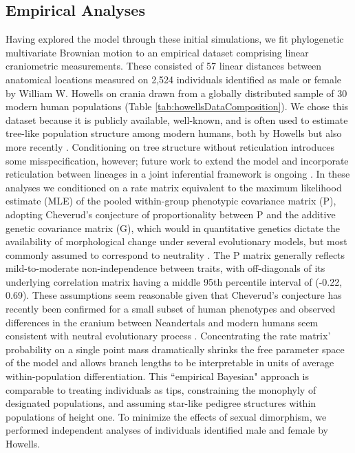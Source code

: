 \documentclass[10pt, twocolumn, twoside]{article}
\begin{document}
\subsection{Empirical Analyses}

Having explored the model through these initial simulations, we fit phylogenetic multivariate Brownian motion to an empirical dataset comprising linear craniometric measurements. These consisted of 57 linear distances between anatomical locations measured on 2,524 individuals identified as male or female by William W. Howells \citeyear{howellsCranialVariationMan1973, howellsSkullShapesMap1989, howellsWhoWhoSkulls1995} on crania drawn from a globally distributed sample of 30 modern human populations (Table \ref{tab:howellsDataComposition}). We chose this dataset because it is publicly available, well-known, and is often used to estimate tree-like population structure among modern humans, both by Howells but also more recently \citep[e.g.][]{rosemanRandomGeneticDrift2016}. Conditioning on tree structure without reticulation introduces some misspecification, however; future work to extend the model and incorporate reticulation between lineages in a joint inferential framework is ongoing \citep[following e.g.][]{pickrellInferencePopulationSplits2012}. In these analyses we conditioned on a rate matrix equivalent to the maximum likelihood estimate (MLE) of the pooled within-group phenotypic covariance matrix (P), adopting Cheverud’s conjecture \citep{cheverudDevelopmentalIntegrationEvolution1996, roffEstimationGeneticCorrelations1995, reuschQuantitativeGeneticsDung1998, waittGeneticPhenotypicCorrelations1998, revellPhylogeneticApproachDetermining2007} of proportionality between P and the additive genetic covariance matrix (G), which would in quantitative genetics dictate the availability of morphological change under several evolutionary models, but most commonly assumed to correspond to neutrality \citep{landeNaturalSelectionRandom1976, landeQuantitativeGeneticAnalysis1979, felsensteinPhylogeniesQuantitativeCharacters1988a}. The P matrix generally reflects mild-to-moderate non-independence between traits, with off-diagonals of its underlying correlation matrix having a middle 95th percentile interval of (-0.22, 0.69). These assumptions seem reasonable given that Cheverud’s conjecture has recently been confirmed for a small subset of human phenotypes \citep{sodiniComparisonGenotypicPhenotypic2018} and observed differences in the cranium between Neandertals and modern humans seem consistent with neutral evolutionary process \citep{weaverWereNeandertalModern2007, weaverUnconstrainedCranialEvolution2015}. Concentrating the rate matrix’ probability on a single point mass dramatically shrinks the free parameter space of the model and allows branch lengths to be interpretable in units of average within-population differentiation. This ``empirical Bayesian" approach is comparable to treating individuals as tips, constraining the monophyly of designated populations, and assuming star-like pedigree structures within populations of height one. To minimize the effects of sexual dimorphism, we performed independent analyses of individuals identified male and female by Howells. 
\end{document}
